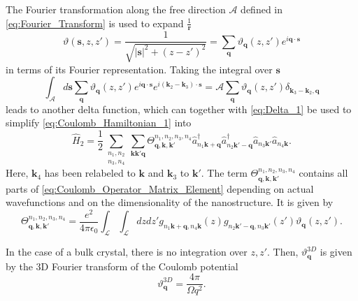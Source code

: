 The Fourier transformation along the free direction $\mathcal{A}$
defined in \ref{eq:Fourier_Transform} is used to expand $\frac{1}{\mathbf{r}}$\begin{equation}
\vartheta(\mathbf{s},z,z')=\frac{1}{\sqrt{\mathbf{\left|s\right|}^{2}+\left(z-z'\right)^{2}}}=\sum_{\mathbf{q}}\vartheta_{\mathbf{q}}(z,z')e^{i\mathbf{q}\cdot\mathbf{s}}\label{eq:Inverse_Distance_Fourier_Expansion}\end{equation}
in terms of its Fourier representation. Taking the integral over $\mathbf{s}$\textbf{\begin{equation}
\int_{\mathcal{A}}d\mathbf{s}\sum_{\mathbf{q}}\vartheta_{\mathbf{q}}(z,z')e^{i\mathbf{q}\cdot\mathbf{s}}e^{i\left(\mathbf{k}_{2}-\mathbf{k}_{3}\right)\cdot\mathbf{s}}=\mathcal{A}\sum_{\mathbf{q}}\vartheta_{\mathbf{q}}(z,z')\delta_{\mathbf{k}_{3}-\mathbf{k}_{2},\mathbf{q}}\end{equation}
}leads to another delta function, which can together with \ref{eq:Delta_1}
be used to simplify \ref{eq:Coulomb_Hamiltonian_1} into\begin{equation}
\hat{H}_{2}=\frac{1}{2}\sum_{\begin{array}{c}
n_{1},n_{2}\\
n_{3},n_{4}\end{array}}\sum_{\mathbf{k}\mathbf{k}'\mathbf{q}}\Theta_{\mathbf{q},\mathbf{k},\mathbf{k}'}^{n_{1},n_{2},n_{3},n_{4}}\hat{a}_{n_{1}\mathbf{k}+\mathbf{q}}^{\dagger}\hat{a}_{n_{2}\mathbf{k}'-\mathbf{q}}^{\dagger}\hat{a}_{n_{3}\mathbf{k}'}\hat{a}_{n_{4}\mathbf{k}}.\label{eq:Coulomb_Hamiltonian_2}\end{equation}
Here, $\mathbf{k}_{4}$ has been relabeled to $\mathbf{k}$ and $\mathbf{k}_{3}$
to $\mathbf{k}'$. The term $\Theta_{\mathbf{q},\mathbf{k},\mathbf{k}'}^{n_{1},n_{2},n_{3},n_{4}}$
contains all parts of \ref{eq:Coulomb_Operator_Matrix_Element} depending
on actual wavefunctions and on the dimensionality of the nanostructure.
It is given by\begin{equation}
\Theta_{\mathbf{q},\mathbf{k},\mathbf{k}'}^{n_{1},n_{2},n_{3},n_{4}}=\frac{e^{2}}{4\pi\epsilon_{0}}\int_{\mathcal{L}}\int_{\mathcal{L}}dzdz'g_{n_{1}\mathbf{k}+\mathbf{q},n_{4}\mathbf{k}}(z)g_{n_{2}\mathbf{k}'-\mathbf{q},n_{3}\mathbf{k}'}(z')\vartheta_{\mathbf{q}}(z,z').\label{eq:Coulomb_Interaction}\end{equation}


In the case of a bulk crystal, there is no integration over $z,z'$.
Then, $\vartheta_{\mathbf{q}}^{3D}$ is given by the 3D Fourier transform
of the Coulomb potential \begin{equation}
\vartheta_{\mathbf{q}}^{3D}=\frac{4\pi}{\Omega q^{2}}.\label{eq:3D_Form_Factor}\end{equation}


